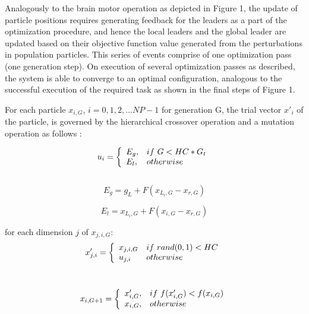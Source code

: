\documentclass[a4paper,twoside]{article}
\begin{document}
Analogously to the brain motor operation as depicted in Figure 1, the update of particle positions requires generating feedback for the leaders as a part of the optimization procedure, and hence the local leaders and the global leader are updated based on their objective function value generated from the perturbations in population particles. This series of events comprise of one optimization pass (one generation step). On execution of several optimization passes as described, the system is able to converge to an optimal configuration, analogous to the successful execution of the required task as shown in the final steps of Figure 1.

For each particle $x_{i,G}$, $i = 0, 1, 2,...NP-1$ for generation G, the trial vector $x'_{i}$ of the particle, is governed by the hierarchical crossover operation and a mutation operation as follows : 

\vspace{-1.5mm}
\begin{equation}
u_i =  
\left\{
\begin{array}{ll}
      E_g, & if \thinspace\thinspace G < HC * G_{t} \\
      E_l, & otherwise \\
\end{array} 
\right. 
\end{equation}\\

\vspace{-5.5mm}
\begin{equation}
\label{one}
E_g = g_L + F (x_{L_i,G} - x_{r,G})
\end{equation}

\vspace{-1.5mm}
\begin{equation}
\label{two}
E_l = x_{L_i,G} + F (x_{i,G} - x_{r,G})
\end{equation}

for each dimension $j$ of $x_{j,i,G}$:
\begin{equation}
x'_{j,i} =  
\left\{
\begin{array}{ll}
      x_{j,i,G} & if \thinspace\thinspace rand(0,1) < HC \\
      u_{j,i} & otherwise \\
\end{array} 
\right. 
\end{equation}\\
\vspace{-5.5mm}

\vspace{-1.5mm}
\begin{equation}
x_{i,G+1} =  
\left\{
\begin{array}{ll}
      x'_{i,G}, & if \thinspace\thinspace f(x'_{i,G}) < f(x_{i,G}) \\
      x_{i,G}, & otherwise \\
\end{array} 
\right. 
\end{equation}\\
\vspace{-2mm}
\end{document}
